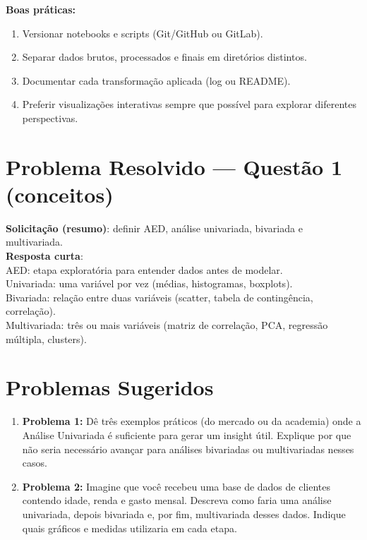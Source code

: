 \begin{NoteBox}
\textbf{Boas práticas:}  
\begin{enumerate}[leftmargin=*]
  \item Versionar notebooks e scripts (Git/GitHub ou GitLab).  
  \item Separar dados brutos, processados e finais em diretórios distintos.  
  \item Documentar cada transformação aplicada (log ou README).  
  \item Preferir visualizações interativas sempre que possível para explorar diferentes perspectivas.  
\end{enumerate}
\end{NoteBox}



\section{Problema Resolvido — Questão 1 (conceitos)}
\begin{SolvedBox}
\textbf{Solicitação (resumo)}: definir AED, análise univariada, bivariada e multivariada.\\[4pt]
\textbf{Resposta curta}:\\
AED: etapa exploratória para entender dados antes de modelar.\\
Univariada: uma variável por vez (médias, histogramas, boxplots).\\
Bivariada: relação entre duas variáveis (scatter, tabela de contingência, correlação).\\
Multivariada: três ou mais variáveis (matriz de correlação, PCA, regressão múltipla, clusters).
\end{SolvedBox}

\section*{Problemas Sugeridos}
\begin{enumerate}[leftmargin=*]
  \item \textbf{Problema 1:} Dê três exemplos práticos (do mercado ou da academia) onde a Análise Univariada é suficiente para gerar um insight útil. Explique por que não seria necessário avançar para análises bivariadas ou multivariadas nesses casos.
  
  \item \textbf{Problema 2:} Imagine que você recebeu uma base de dados de clientes contendo idade, renda e gasto mensal. Descreva como faria uma análise univariada, depois bivariada e, por fim, multivariada desses dados. Indique quais gráficos e medidas utilizaria em cada etapa.
\end{enumerate}




